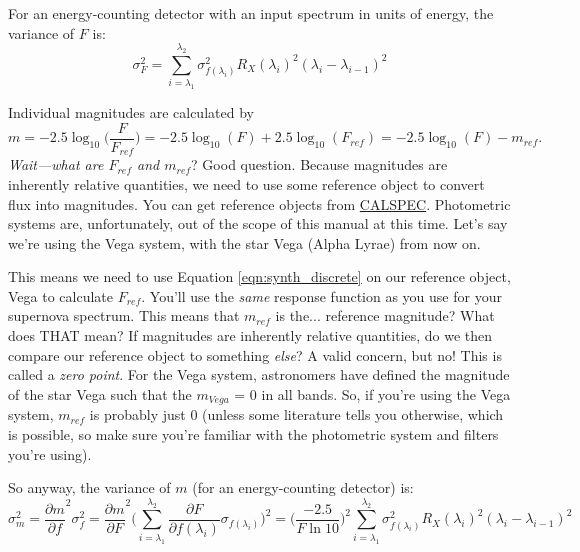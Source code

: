 For an energy-counting detector with an input spectrum in units of energy, the variance of $F$ is:
\begin{equation}
\label{eqn:varenergy}
    \sigma_{F}^{2} = \sum_{i=\lambda_{1}}^{\lambda_{2}} \sigma_{f(\lambda_{i})}^{2} R_{X}(\lambda_{i})^{2}(\lambda_{i} - \lambda_{i-1})^{2} 
\end{equation}

Individual magnitudes are calculated by
\begin{equation}
    m = -2.5\log_{10}\Big(\frac{F}{F_{ref}}\Big) = -2.5\log_{10}(F) + 2.5\log_{10}(F_{ref}) = -2.5\log_{10}(F) - m_{ref}.
\end{equation}
\textit{Wait---what are $F_{ref}$ and $m_{ref}$}? Good question. Because magnitudes are inherently relative quantities, we need to use some reference object to convert flux into magnitudes. You can get reference objects from \href{https://www.stsci.edu/hst/instrumentation/reference-data-for-calibration-and-tools/astronomical-catalogs/calspec}{CALSPEC}. Photometric systems are, unfortunately, out of the scope of this manual at this time. Let's say we're using the Vega system, with the star Vega (Alpha Lyrae) from now on. 

This means we need to use Equation \ref{eqn:synth_discrete} on our reference object, Vega to calculate $F_{ref}$. You'll use the \textit{same} response function as you use for your supernova spectrum. This means that $m_{ref}$ is the... reference magnitude? What does THAT mean? If magnitudes are inherently relative quantities, do we then compare our reference object to something \textit{else}? A valid concern, but no! This is called a \textit{zero point}. For the Vega system, astronomers have defined the magnitude of the star Vega such that the $m_{Vega}$ = 0 in all bands. So, if you're using the Vega system, $m_{ref}$ is probably just 0 (unless some literature tells you otherwise, which is possible, so make sure you're familiar with the photometric system and filters you're using).

So anyway, the variance of $m$ (for an energy-counting detector) is:
\begin{equation}
    \sigma_{m}^{2} = \frac{\partial m}{\partial f}^{2} \sigma_{f}^{2} = \frac{\partial m}{\partial F}^{2} \Big( \sum_{i=\lambda_{1}}^{\lambda_{2}} \frac{\partial F}{\partial f(\lambda_{i})} \sigma_{f(\lambda_{i})}\Big)^{2} = \Big( \frac{-2.5}{F\ln10} \Big)^{2} \sum_{i=\lambda_{1}}^{\lambda_{2}}\sigma_{f(\lambda_{i})}^{2} R_{X}(\lambda_{i})^{2}(\lambda_{i}-\lambda_{i-1})^{2}
    \label{eqn:m_err}
\end{equation}


